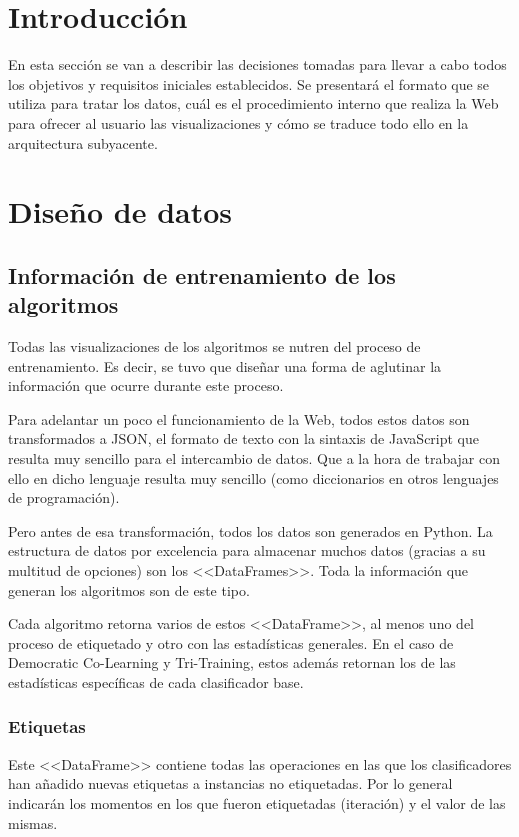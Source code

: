 
\section{Introducción}

En esta sección se van a describir las decisiones tomadas para llevar a cabo
todos los objetivos y requisitos iniciales establecidos. Se presentará el
formato que se utiliza para tratar los datos, cuál es el procedimiento interno
que realiza la Web para ofrecer al usuario las visualizaciones y cómo se traduce
todo ello en la arquitectura subyacente.

\section{Diseño de datos}

\subsection{Información de entrenamiento de los algoritmos}

Todas las visualizaciones de los algoritmos se nutren del proceso de
entrenamiento. Es decir, se tuvo que diseñar una forma de aglutinar la
información que ocurre durante este proceso.

Para adelantar un poco el funcionamiento de la Web, todos estos datos son
transformados a JSON, el formato de texto con la sintaxis de JavaScript que
resulta muy sencillo para el intercambio de datos. Que a la hora de trabajar con
ello en dicho lenguaje resulta muy sencillo (como diccionarios en otros
lenguajes de programación).

Pero antes de esa transformación, todos los datos son generados en Python. La
estructura de datos por excelencia para almacenar muchos datos (gracias a su
multitud de opciones) son los <<DataFrames>>. Toda la información que generan
los algoritmos son de este tipo.

Cada algoritmo retorna varios de estos <<DataFrame>>, al menos uno del proceso
de etiquetado y otro con las estadísticas generales. En el caso de Democratic
Co-Learning y Tri-Training, estos además retornan los de las estadísticas
específicas de cada clasificador base.

\subsubsection{Etiquetas}
Este <<DataFrame>> contiene todas las operaciones en las que los clasificadores
han añadido nuevas etiquetas a instancias no etiquetadas. Por lo general
indicarán los momentos en los que fueron etiquetadas (iteración) y el valor de
las mismas.

